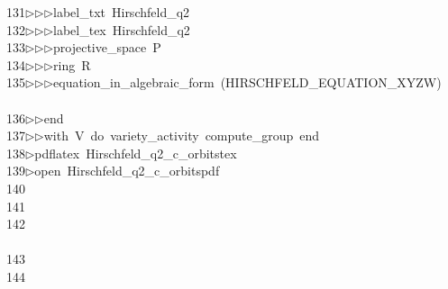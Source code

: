 \begin{tabbing}
131\>$\triangleright$\>$\triangleright$\>$\triangleright$\>label\_txt\ Hirschfeld\_q2\ \\[0pt]
132\>$\triangleright$\>$\triangleright$\>$\triangleright$\>label\_tex\ Hirschfeld\_q2\ \\[0pt]
133\>$\triangleright$\>$\triangleright$\>$\triangleright$\>projective\_space\ P\ \\[0pt]
134\>$\triangleright$\>$\triangleright$\>$\triangleright$\>ring\ R\ \\[0pt]
135\>$\triangleright$\>$\triangleright$\>$\triangleright$\>equation\_in\_algebraic\_form\ (HIRSCHFELD\_EQUATION\_XYZW)\\[0pt]
\>\ \\[0pt]
136\>$\triangleright$\>$\triangleright$\>end\ \\[0pt]
137\>$\triangleright$\>$\triangleright$\>with\ V\ do\ variety\_activity\ compute\_group\ end\ \\[0pt]
138\>$\triangleright$\>pdflatex\ Hirschfeld\_q2\_c\_orbitstex\\[0pt]
139\>$\triangleright$\>open\ Hirschfeld\_q2\_c\_orbitspdf\\[0pt]
140\>\\[0pt]
141\>\\[0pt]
142\>\\[0pt]
\>\\[0pt]
143\>\ \\[0pt]
144\>\\[0pt]

\end{tabbing}

